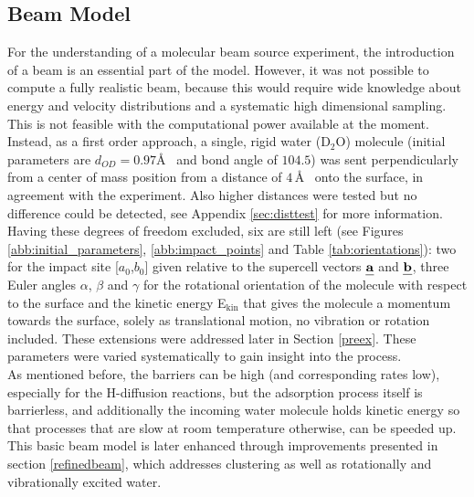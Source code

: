 \documentclass[11pt,DIV=13,BCOR=5mm,a4paper,headinclude]{scrbook}
\def\mathbi#1{\textbf{\em #1}}
\renewcommand{\vec}[1]{\mathbi{#1}}
\begin{document}
\subsection{Beam Model} \label{beammodel}
For the understanding of a molecular beam source experiment, the introduction of a beam is an essential part of the model.
However, it was not possible to compute a fully realistic beam, because this would require wide knowledge about energy and velocity distributions and a systematic high dimensional sampling.
This is not feasible with the computational power available at the moment.
Instead, as a first order approach, a single, rigid water (D$_2$O) molecule (initial parameters are $d_{OD}=0.97$\AA~ and bond angle of $104.5$\textdegree) was sent perpendicularly from a center of mass position from a distance of $4\,$\AA~ onto the surface, in agreement with the experiment.
Also higher distances were tested but no difference could be detected, see Appendix \ref{sec:disttest} for more information.
Having these degrees of freedom excluded, six are still left (see Figures \ref{abb:initial_parameters}, \ref{abb:impact_points} and Table \ref{tab:orientations}): two for the impact site [$a_0$,$b_0$] given relative to the supercell vectors $\vec{a}$ and $\vec{b}$, three Euler angles $\alpha$, $\beta$ and $\gamma$ for the rotational orientation of the molecule with respect to the surface and the kinetic energy E$_\textrm{kin}$ that gives the molecule a momentum towards the surface, solely as translational motion, no vibration or rotation included.
These extensions were addressed later in Section \ref{preex}.
These parameters were varied systematically to gain insight into the process.
\\
As mentioned before, the barriers can be high (and corresponding rates low), especially for the H-diffusion reactions, but the adsorption process itself is barrierless, and additionally the incoming water molecule holds kinetic energy so that processes that are slow at room temperature otherwise, can be speeded up.
\\
This basic beam model is later enhanced through improvements presented in section \ref{refinedbeam}, which addresses clustering as well as rotationally and vibrationally excited water.
\end{document}
